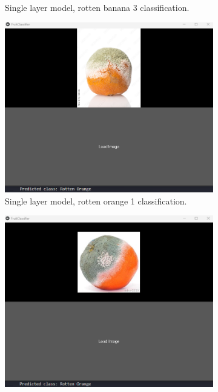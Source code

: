 \documentclass[conference]{IEEEtran}
\begin{document}
\begin{figure}[h]
\begin{subfigure}[b]{0.48\linewidth}
        \caption{Single layer model, rotten banana 3 classification.}
        \label{figFB}
    \end{subfigure}
    \hfill
    \begin{subfigure}[b]{0.48\linewidth}
        \centering
        \includegraphics[width=\linewidth]{1layer orageR1.png}
        \caption{Single layer model, rotten orange 1 classification.}
        \label{figFA}
    \end{subfigure}
    \hfill
    \begin{subfigure}[b]{0.48\linewidth}
        \centering
        \includegraphics[width=\linewidth]{1layer orageR2.png}

\end{subfigure}
\end{figure}
\end{document}
